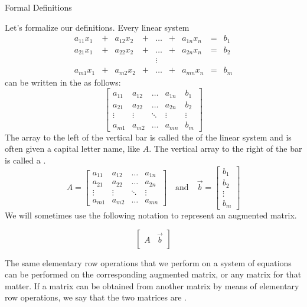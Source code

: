 \documentclass{ximera}
\begin{document}
 

\begin{remark}{Formal Definitions}

  Let's formalize our definitions.  Every linear system
$$\begin{array}{ccccccccc}
      a_{11}x_1 &+ &a_{12}x_2&+&\ldots&+&a_{1n}x_n&= &b_1 \\
     a_{21}x_1 &+ &a_{22}x_2&+&\ldots&+&a_{2n}x_n&= &b_2 \\
     &&&&\vdots&&&& \\
     a_{m1}x_1 &+ &a_{m2}x_2&+&\ldots&+&a_{mn}x_n&= &b_m
    \end{array}$$
    can be written in the  as follows:
    $$\left[\begin{array}{cccc|c} 
 a_{11}&a_{12}&\ldots&a_{1n}&b_1\\a_{21}&a_{22}&\ldots&a_{2n}&b_2\\\vdots&\vdots&\ddots&\vdots&\vdots\\a_{m1}&a_{m2}&\ldots&a_{mn}&b_m
 \end{array}\right]$$
 The array to the left of the vertical bar is called the  of the linear system and is often given a capital letter name, like $A$.  The vertical array to the right of the bar is called a .
 $$A=\begin{bmatrix}a_{11}&a_{12}&\ldots&a_{1n}\\a_{21}&a_{22}&\ldots&a_{2n}\\\vdots&\vdots&\ddots&\vdots\\a_{m1}&a_{m2}&\ldots&a_{mn}\end{bmatrix}\quad\text{and}\quad\vec{b}=\begin{bmatrix}b_1\\b_2\\\vdots\\b_m\end{bmatrix}$$
We will sometimes use the following notation to represent an augmented matrix.
 
$$\left[\begin{array}{c|c} 
 A & \vec{b}\\
 \end{array}\right]$$

The same elementary row operations that we perform on a system of equations can be performed on the corresponding augmented matrix, or any matrix for that matter.  If a matrix can be obtained from another matrix by means of elementary row operations, we say that the two matrices are . 
\end{remark}
\end{document}

